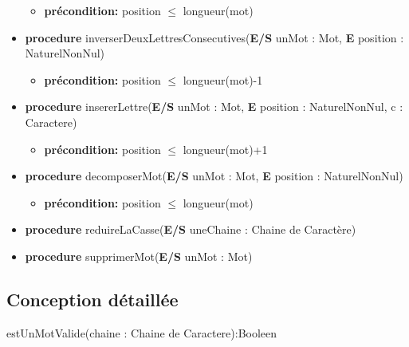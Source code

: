 \begin{itemize}[label=$\ $, leftmargin=1cm]
\begin{itemize}[label=$| $]
            \item \textbf{précondition:} position $\leq$ longueur(mot)
         \end{itemize}
         \item \textbf{procedure} inverserDeuxLettresConsecutives(\textbf{E/S} unMot : Mot, \textbf{E} position : NaturelNonNul)
         \begin{itemize}[label=$| $]
            \item \textbf{précondition:} position $\leq$ longueur(mot)-1
         \end{itemize}
         \item \textbf{procedure} insererLettre(\textbf{E/S} unMot : Mot, \textbf{E} position : NaturelNonNul, c : Caractere)
         \begin{itemize}[label=$| $]
            \item \textbf{précondition:} position $\leq$ longueur(mot)+1
         \end{itemize}
         \item \textbf{procedure} decomposerMot(\textbf{E/S} unMot : Mot, \textbf{E} position : NaturelNonNul)
         \begin{itemize}[label=$| $]
            \item \textbf{précondition:} position $\leq$ longueur(mot)
         \end{itemize}
         \item \textbf{procedure} reduireLaCasse(\textbf{E/S} uneChaine : Chaine de Caractère)
         \item \textbf{procedure} supprimerMot(\textbf{E/S} unMot : Mot)
	\end{itemize} 

    \subsection*{Conception détaillée}

    \begin{function}
        \SetAlgoLined
        \caption{estUnMotValide(chaine : Chaine de Caractere):Booleen}
    \end{function}
        
